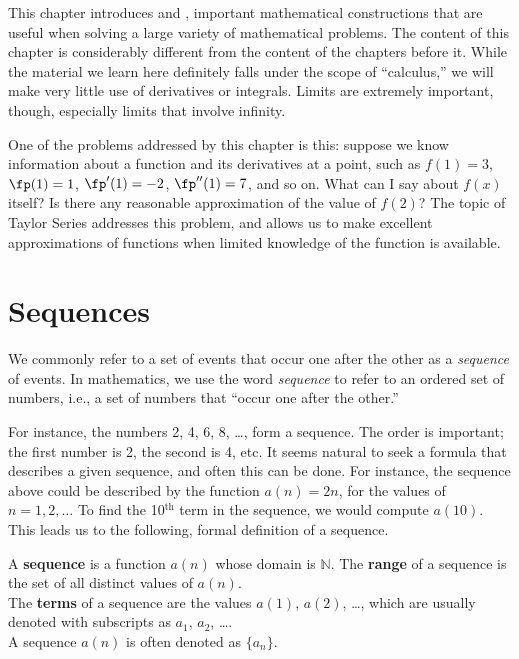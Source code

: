 This chapter introduces  and , important mathematical constructions that are useful when solving a large variety of mathematical problems. The content of this chapter is considerably different from the content of the chapters before it. While the material we learn here definitely falls under the scope of ``calculus,'' we will make very little use of derivatives or integrals. Limits are extremely important, though, especially limits that involve infinity. 

One of the problems addressed by this chapter is this: suppose we know information about a function and its derivatives at a point, such as  $f(1) = 3$, $\fp(1) = 1$, $\fp'(1) = -2$, $\fp''(1) = 7$, and so on. What can I say about $f(x)$ itself? Is there any reasonable approximation of the value of $f(2)$? The topic of Taylor Series addresses this problem, and allows us to make excellent approximations of functions when limited knowledge of the function is available.

\section{Sequences}\label{sec:sequences}

We commonly refer to a set of events that occur one after the other as a \textit{sequence} of events. In mathematics, we use the word \textit{sequence} to refer to an ordered set of numbers, i.e., a set of numbers that ``occur one after the other.''

For instance, the numbers 2, 4, 6, 8, \ldots, form a sequence. The order is important; the first number is 2, the second is 4, etc. It seems natural to seek a formula that describes a given sequence, and often this can be done. For instance, the sequence above could be described by the function $a(n) = 2n$, for the values of $n = 1, 2, \ldots$ To find the 10$^\text{th}$ term in the sequence, we would compute $a(10)$. This leads us to the following, formal definition of a sequence.

{A \textbf{sequence} is a function $a(n)$ whose domain is $\mathbb{N}$. The \textbf{range} of a sequence is the set of all distinct values of $a(n)$.
\\

The \textbf{terms} of a sequence are the values $a(1)$, $a(2)$, \ldots, which are usually denoted with subscripts as $a_1$, $a_2$, \ldots.\\

A sequence $a(n)$ is often denoted as $\{a_n\}$.}

